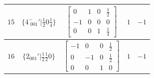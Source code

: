 \documentclass[fleqn,8pt]{jsarticle}
\begin{document}
\begin{longtable}{ccccc}
$ 15 $ & $ \{4^{-}_{\,\,001}{}'|\frac{1}{2} 0 \frac{1}{4}\} $ & $ \begin{bmatrix} 0 & 1 & 0 & \frac{1}{2} \\ -1 & 0 & 0 & 0 \\ 0 & 0 & 1 & \frac{1}{4} \end{bmatrix} $ & $ 1 $ & $ -1 $ \\ \hline
$ 16 $ & $ \{2{}_{001}{}'|\frac{1}{2} \frac{1}{2} 0\} $ & $ \begin{bmatrix} -1 & 0 & 0 & \frac{1}{2} \\ 0 & -1 & 0 & \frac{1}{2} \\ 0 & 0 & 1 & 0 \end{bmatrix} $ & $ 1 $ & $ -1 $ \\
\end{longtable}
\end{document}
